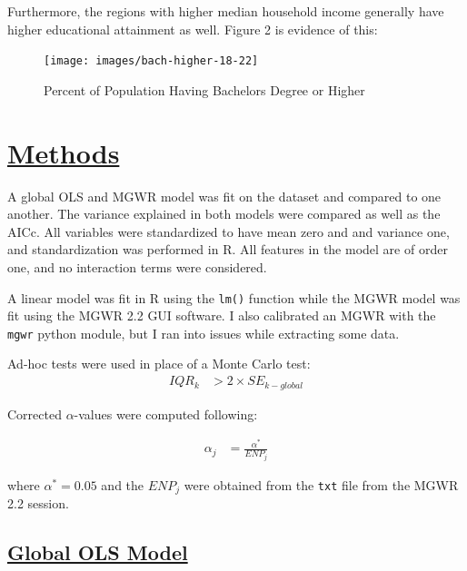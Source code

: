 \documentclass[
]{article}
\begin{document}
\newpage

Furthermore, the regions with higher median household income generally
have higher educational attainment as well. Figure 2 is evidence of
this:

\begin{figure}[H]

{\centering \texttt{[image: images/bach-higher-18-22]} 

}

\caption{Percent of Population Having Bachelors Degree or Higher}\label{fig:unnamed-chunk-4}
\end{figure}

\newpage

\section{\texorpdfstring{\ul{Methods}}{Methods}}\label{methods}

A global OLS and MGWR model was fit on the dataset and compared to one
another. The variance explained in both models were compared as well as
the AICc. All variables were standardized to have mean zero and and
variance one, and standardization was performed in R. All features in
the model are of order one, and no interaction terms were considered.

A linear model was fit in R using the \texttt{lm()} function while the
MGWR model was fit using the MGWR 2.2 GUI software. I also calibrated an
MGWR with the \texttt{mgwr} python module, but I ran into issues while
extracting some data.

Ad-hoc tests were used in place of a Monte Carlo test:\\

\[
\begin{aligned}
IQR_{k} &> 2\times SE_{k-global}
\end{aligned}
\]

Corrected \(\alpha\)-values were computed following:

\[
\begin{aligned}
\alpha_{j} &= \frac{\alpha^{*}}{ENP_{j}}
\end{aligned}
\]

where \(\alpha^{*} = 0.05\) and the \(ENP_{j}\) were obtained from the
\texttt{txt} file from the MGWR 2.2 session.

\newpage

\subsection{\texorpdfstring{\ul{Global OLS
Model}}{Global OLS Model}}\label{global-ols-model}
\end{document}
